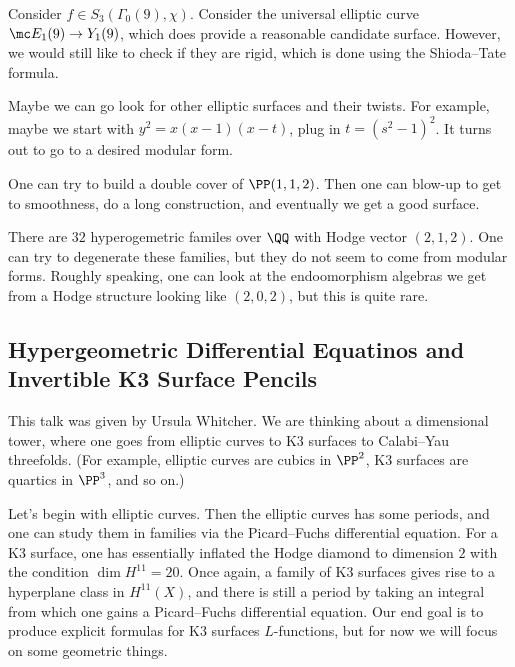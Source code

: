 \documentclass{article}
\begin{document}
\begin{example}
	Consider $f\in S_3(\Gamma_0(9),\chi)$. Consider the universal elliptic curve $\mc E_1(9)\to Y_1(9)$, which does provide a reasonable candidate surface. However, we would still like to check if they are rigid, which is done using the Shioda--Tate formula.
\end{example}
\begin{example}
	Maybe we can go look for other elliptic surfaces and their twists. For example, maybe we start with $y^2=x(x-1)(x-t)$, plug in $t=\left(s^2-1\right)^2$. It turns out to go to a desired modular form.
\end{example}
\begin{example}
	One can try to build a double cover of $\PP(1,1,2)$. Then one can blow-up to get to smoothness, do a long construction, and eventually we get a good surface.
\end{example}
\begin{example}
	There are $32$ hyperogemetric familes over $\QQ$ with Hodge vector $(2,1,2)$. One can try to degenerate these families, but they do not seem to come from modular forms. Roughly speaking, one can look at the endoomorphism algebras we get from a Hodge structure looking like $(2,0,2)$, but this is quite rare.
\end{example}

\subsection{Hypergeometric Differential Equatinos and Invertible K3 Surface Pencils}
This talk was given by Ursula Whitcher. We are thinking about a dimensional tower, where one goes from elliptic curves to K3 surfaces to Calabi--Yau threefolds. (For example, elliptic curves are cubics in $\PP^2$, K3 surfaces are quartics in $\PP^3$, and so on.)

Let's begin with elliptic curves. Then the elliptic curves has some periods, and one can study them in families via the Picard--Fuchs differential equation. For a K3 surface, one has essentially inflated the Hodge diamond to dimension $2$ with the condition $\dim H^{11}=20$. Once again, a family of K3 surfaces gives rise to a hyperplane class in $H^{11}(X)$, and there is still a period by taking an integral from which one gains a Picard--Fuchs differential equation. Our end goal is to produce explicit formulas for K3 surfaces $L$-functions, but for now we will focus on some geometric things.
\end{document}
